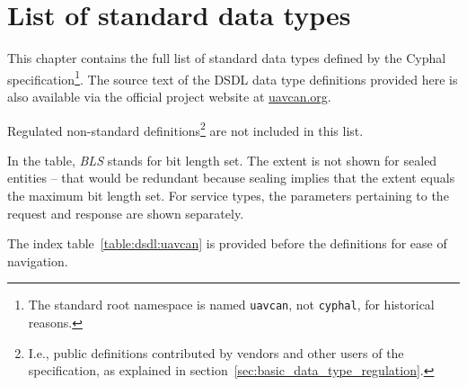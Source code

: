 \chapter{List of standard data types}\label{sec:sdt}

This chapter contains the full list of standard data types defined by the Cyphal specification\footnote{%
    The standard root namespace is named \texttt{uavcan}, not \texttt{cyphal}, for historical reasons.
}.
The source text of the DSDL data type definitions provided here is also available via the
official project website at \href{http://uavcan.org}{uavcan.org}.

Regulated non-standard definitions\footnote{%
    I.e., public definitions contributed by vendors and other users
    of the specification, as explained in section~\ref{sec:basic_data_type_regulation}.
} are not included in this list.

In the table, \emph{BLS} stands for bit length set.
The extent is not shown for sealed entities -- that would be redundant because sealing implies
that the extent equals the maximum bit length set.
For service types, the parameters pertaining to the request and response are shown separately.

The index table~\ref{table:dsdl:uavcan} is provided before the definitions for ease of navigation.

\clearpage{}
